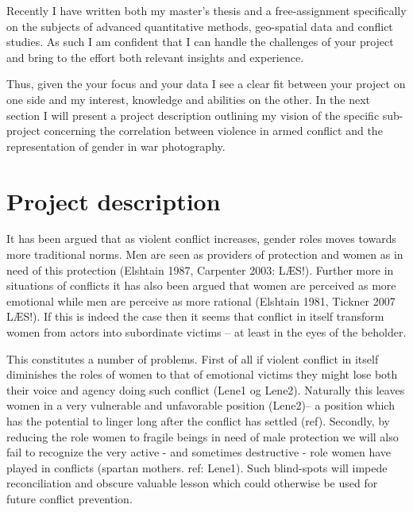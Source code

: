 \documentclass[a4paper]{article}
\begin{document}
Recently I have written both my master's thesis \citep{SPECIALE} and a free-assignment \citep{Maase} specifically on the subjects of advanced quantitative methods, geo-spatial data and conflict studies. As such I am confident that I can handle the challenges of your project and bring to the effort both relevant insights and experience.\par%

Thus, given the your focus and your data I see a clear fit between your project on one side and my interest, knowledge and abilities on the other. In the next section I will present a project description outlining my vision of the specific sub-project concerning the correlation between violence in armed conflict and the representation of gender in war photography.\par


\section{Project description} 

It has been argued that as violent conflict increases, gender roles moves towards more traditional norms. Men are seen as providers of protection and women as in need of this protection (Elshtain 1987, Carpenter 2003: LÆS!). Further more in situations of conflicts it has also been argued that women are perceived as more emotional while men are perceive as more rational (Elshtain 1981, Tickner 2007 LÆS!). If this is indeed the case then it seems that conflict in itself transform women from actors into subordinate victims -- at least in the eyes of the beholder. 

This constitutes a number of problems. First of all if violent conflict in itself diminishes the roles of women to that of emotional victims they might lose both their voice and agency doing such conflict (Lene1 og Lene2). Naturally this leaves women in a very vulnerable and unfavorable position (Lene2)-- a position which has the potential to linger long after the conflict has settled (ref). Secondly, by reducing the role women to fragile beings in need of male protection we will also fail to recognize the very active - and sometimes destructive - role women have played in conflicts (spartan mothers. ref: Lene1). Such blind-spots will impede reconciliation and obscure valuable lesson which could otherwise be used for future conflict prevention.\par
\end{document}
